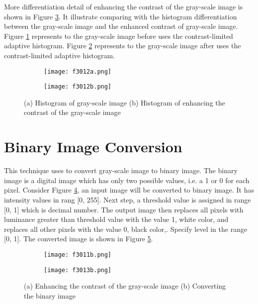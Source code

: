 More differentiation detail of enhancing the contrast of the gray-scale image is shown in Figure \ref{fig:f3012}. It illustrate comparing with the histogram differentiation between the gray-scale image and the enhanced contrast of gray-scale image. Figure \ref{fig:f3012a} represents to the gray-scale image before uses the contrast-limited adaptive histogram. Figure \ref{fig:f3012b} represents to the gray-scale image after uses the contrast-limited adaptive histogram.
\begin{figure}
	\centering
	\begin{subfigure}[b]{0.4\textwidth}
		\texttt{[image: f3012a.png]}
		\caption{}\label{fig:f3012a}
	\end{subfigure}
	\begin{subfigure}[b]{0.4\textwidth}
		\texttt{[image: f3012b.png]}
		\caption{}\label{fig:f3012b}
	\end{subfigure}
	\caption{(a) Histogram of gray-scale image (b) Histogram of enhancing the contrast of the gray-scale image}\label{fig:f3012}
\end{figure}


\section{Binary Image Conversion}\label{sec:3.5}
This technique uses to convert gray-scale image to binary image. The binary image is a digital image which has only two possible values, i.e. a 1 or 0 for each pixel. Consider Figure \ref{fig:f3013a}, an input image will be converted to binary image. It has intensity values in rang [0, 255]. Next step, a threshold value is assigned in range [0, 1] which is decimal number. The output image then replaces all pixels with luminance greater than threshold value with the value 1, white color, and replaces all other pixels with the value 0, black color,. Specify level in the range [0, 1]. The converted image is shown in Figure \ref{fig:f3013b}.
\begin{figure}
	\centering
	\begin{subfigure}[b]{0.3\textwidth}
		\texttt{[image: f3011b.png]}
		\caption{}\label{fig:f3013a}
	\end{subfigure}
	\begin{subfigure}[b]{0.3\textwidth}
		\texttt{[image: f3013b.png]}
		\caption{}\label{fig:f3013b}
	\end{subfigure}
	\caption{(a) Enhancing the contrast of the gray-scale image (b) Converting the binary image }\label{fig:f3013}
\end{figure}

